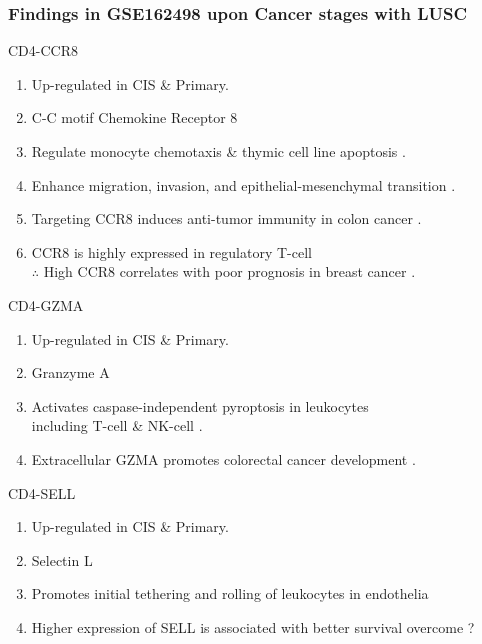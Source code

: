 \documentclass{beamer}
\begin{document}
    \begin{frame}[allowframebreaks]
        \frametitle{Findings in GSE162498 upon Cancer stages with LUSC}

        \begin{block}{CD4-CCR8}
            \begin{enumerate}
                \item Up-regulated in CIS \& Primary.
                \item C-C motif Chemokine Receptor 8
                \item Regulate monocyte chemotaxis \& thymic cell line apoptosis \cite{CCR8-1}.
                \item Enhance migration, invasion, and epithelial-mesenchymal transition \cite{CCR8-2}.
                \item Targeting CCR8 induces anti-tumor immunity in colon cancer \cite{CCR8-3}.
                \item CCR8 is highly expressed in regulatory T-cell \\
                    $\therefore$ High CCR8 correlates with poor prognosis in breast cancer \cite{CCR8-4}.
            \end{enumerate}
        \end{block}

        \begin{block}{CD4-GZMA}
            \begin{enumerate}
                \item Up-regulated in CIS \& Primary.
                \item Granzyme A
                \item Activates caspase-independent pyroptosis in leukocytes \\
                    including T-cell \& NK-cell \cite{GZMA-1, GZMA-2, GZMA-3}.
                \item Extracellular GZMA promotes colorectal cancer development \cite{GZMA-4}.
            \end{enumerate}
        \end{block}

        \begin{block}{CD4-SELL}
            \begin{enumerate}
                \item Up-regulated in CIS \& Primary.
                \item Selectin L
                \item Promotes initial tethering and rolling of leukocytes in endothelia \cite{SELL-1, SELL-2}
                \item Higher expression of SELL is associated with better survival overcome \cite{SELL-3} ?
            \end{enumerate}
        \end{block}


\end{frame}
\end{document}
